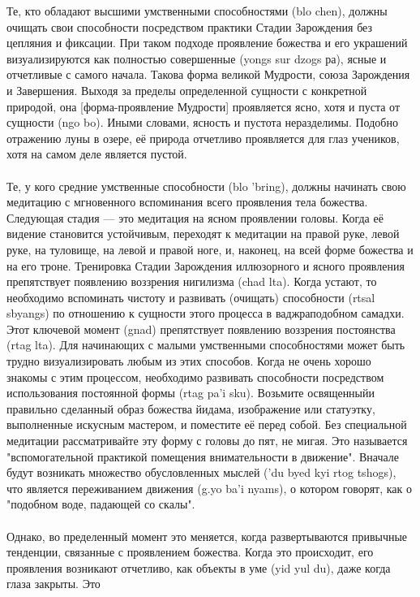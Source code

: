 Те, кто обладают высшими умственными способностями (blo chen), должны очищать
свои способности посредством практики Стадии Зарождения без цепляния и фиксации. При
таком подходе проявление божества и его украшений визуализируются как полностью
совершенные (yongs sur dzogs ра), ясные и отчетливые с самого начала. Такова форма
великой Мудрости, союза Зарождения и Завершения. Выходя за пределы определенной
сущности с конкретной природой, она [форма-проявление Мудрости] проявляется ясно, хотя
и пуста от сущности (ngo bo). Иными словами, ясность и пустота неразделимы. Подобно
отражению луны в озере, её природа отчетливо проявляется для глаз учеников, хотя на
самом деле является пустой.\\
\\
Те, у кого средние умственные способности (blo 'bring), должны начинать свою
медитацию с мгновенного вспоминания всего проявления тела божества. Следующая стадия
— это медитация на ясном проявлении головы. Когда её видение становится устойчивым,
переходят к медитации на правой руке, левой руке, на туловище, на левой и правой ноге, и,
наконец, на всей форме божества и на его троне. Тренировка Стадии Зарождения
иллюзорного и ясного проявления препятствует появлению воззрения нигилизма (chad lta).
Когда устают, то необходимо вспоминать чистоту и развивать (очищать) способности (rtsal
sbyangs) по отношению к сущности этого процесса в ваджраподобном самадхи. Этот
ключевой момент (gnad) препятствует появлению воззрения постоянства (rtag lta).
Для начинающих с малыми умственными способностями может быть трудно
визуализировать любым из этих способов. Когда не очень хорошо знакомы с этим
процессом, необходимо развивать способности посредством использования постоянной
формы (rtag pa'i sku). Возьмите освященныйи правильно сделанный образ божества йидама,
изображение или статуэтку, выполненные искусным мастером, и поместите её перед собой.
Без специальной медитации рассматривайте эту форму с головы до пят, не мигая. Это
называется "вспомогательной практикой помещения внимательности в движение". Вначале
будут возникать множество обусловленных мыслей ('du byed kyi rtog tshogs), что является
переживанием движения (g.yo ba'i nyams), о котором говорят, как о "подобном воде,
падающей со скалы".\\
\\
Однако, во пределенный момент это меняется, когда развертываются привычные
тенденции, связанные с проявлением божества. Когда это происходит, его проявления
возникают отчетливо, как объекты в уме (yid yul du), даже когда глаза закрыты. Это
